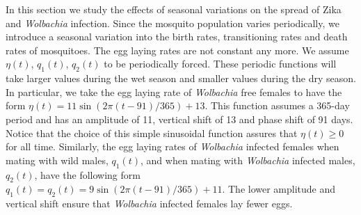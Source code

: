 \documentclass{ws-rv9x6}
\begin{document}

In this section we study the effects of seasonal variations on the spread of Zika and \textit{Wolbachia} infection. Since the mosquito population varies periodically, we introduce a seasonal variation into the birth rates, transitioning rates and death rates of mosquitoes. The egg laying rates are not constant any more. We assume $\eta(t)$, $q_1(t)$, $q_2(t)$ to be periodically forced. These periodic functions will take larger values during the wet season and smaller values during the dry season. In particular, we take the egg laying rate of \textit{\textit{Wolbachia}} free females to have the form
$\eta(t)=11\sin\left(2\pi(t-91)/365\right)+13$. This function assumes a 365-day period and has an amplitude of 11, vertical shift of 13 and phase shift of 91 days. Notice that the choice of this simple sinusoidal function assures that $\eta(t)\geq 0$ for all time. Similarly, the egg laying rates of \textit{Wolbachia} infected females when mating with wild males, $q_1(t)$, and when mating with \textit{Wolbachia} infected males, $q_2(t)$, have the following form $q_1(t)=q_2(t)=9\sin\left(2\pi(t-91)/365\right)+11$. The lower amplitude and vertical shift ensure that \textit{Wolbachia} infected females lay fewer eggs.
\end{document}
